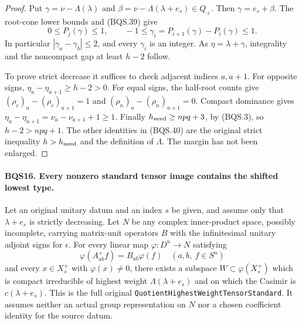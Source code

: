 \begin{proof}
Put $\gamma=\nu-\Lambda(\lambda)$ and
$\beta=\nu-\Lambda(\lambda+e_s)\in Q_+$.
Then $\gamma=e_s+\beta$.  The root-cone lower bounds and (BQS.39)
give
\[
        0\le P_j(\gamma)\le1,\qquad
        -1\le\gamma_i=P_{i+1}(\gamma)-P_i(\gamma)\le1.
 \tag{BQS.41}
\]
In particular $|\gamma_a-\gamma_b|\le2$, and every $\gamma_i$ is an
integer.  As $\eta=\lambda+\gamma$, integrality and the noncompact
gap at least $h-2$ follow.

To prove strict decrease it suffices to check adjacent indices $a,a+1$.
For opposite signs,
$\eta_a-\eta_{a+1}\ge h-2>0$.
For equal signs, the half-root counts give
$(\rho_c)_a-(\rho_c)_{a+1}=1$ and
$(\rho_n)_a-(\rho_n)_{a+1}=0$.
Compact dominance gives
$\eta_a-\eta_{a+1}=\nu_a-\nu_{a+1}+1\ge1$.
Finally $h_{\rm need}\ge npq+3$, by (BQS.3), so $h-2>npq+1$.
The other identities in (BQS.40) are the original strict inequality
$h>h_{\rm need}$ and the definition of $\Lambda$.
The margin has not been enlarged.
\end{proof}

\paragraph{BQS16. Every nonzero standard tensor image contains the shifted lowest type.}
\label{claim:BQS16}
Let an original unitary datum and an index $s$ be given, and assume only
that $\lambda+e_s$ is strictly decreasing.
Let $N$ be any complex inner-product space, possibly incomplete, carrying
matrix-unit operators $B$ with the infinitesimal unitary adjoint signs
for $\epsilon$.
For every linear map $\varphi:D^n\to N$ satisfying
\[
       \varphi(A^+_{ab}f)=B_{ab}\varphi(f)
                  \quad(a,b,\ f\in S^n)
 \tag{BQS.42}
\]
and every $x\in X_s^+$ with $\varphi(x)\ne0$, there exists a subspace
$W\subset\varphi(X_s^+)$ which is compact irreducible of highest weight
$\Lambda(\lambda+e_s)$ and on which the Casimir is $c(\lambda+e_s)$.
This is the full original \texttt{QuotientHighestWeightTensorStandard}.
It assumes neither an actual group representation on $N$ nor a chosen
coefficient identity for the source datum.

